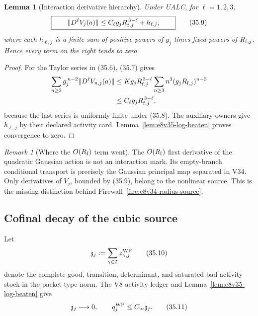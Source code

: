 \documentclass[11pt,oneside]{book}
\newtheorem{lemma}[theorem]{Lemma}
\theoremstyle{definition}
\theoremstyle{remark}
\newtheorem{remark}[theorem]{Remark}
\begin{document}
\begin{lemma}[Interaction derivative hierarchy]
\label{lem:e8v35-derivative-hierarchy}
Under UALC, for \(\ell=1,2,3\),
\[
\boxed{\qquad
 \|D^\ell V_j(a)\|
 \leq
 C_\ell g_jR_{{\rm f},j}^{\,3-\ell}
 +h_{\ell,j},
\qquad}                                                         \tag{35.9}
\]
where each \(h_{\ell,j}\) is a finite sum of positive powers of
\(g_j\) times fixed powers of \(R_{{\rm f},j}\).  Hence every term on
the right tends to zero.
\end{lemma}

\begin{proof}
For the Taylor series in (35.6), (35.7) gives
\[
\begin{split}
 \sum_{n\geq3}g_j^{\,n-2}\|D^\ell V_{n,j}(a)\|
 &\leq
 Kg_jR_{{\rm f},j}^{\,3-\ell}
 \sum_{n\geq3}n^3
 (g_jR_{{\rm f},j})^{n-3}\\
 &\leq C_\ell g_jR_{{\rm f},j}^{\,3-\ell},
\end{split}
\]
because the last series is uniformly finite under (35.8).
The auxiliary owners give \(h_{\ell,j}\) by their declared activity
card.  Lemma~\ref{lem:e8v35-log-beaten} proves convergence to zero.
\end{proof}

\begin{remark}[Where the \(O(R_{\rm f})\) term went]
\label{rem:e8v35-Gaussian-split}
The \(O(R_{\rm f})\) first derivative of the quadratic Gaussian
action is not an interaction mark.  Its empty-branch conditional
transport is precisely the Gaussian principal map separated in
V34.  Only derivatives of \(V_j\), bounded by (35.9), belong to the
nonlinear source.  This is the missing distinction behind
Firewall~\ref{fire:e8v34-radius-source}.
\end{remark}

\subsection{Cofinal decay of the cubic source}

Let
\[
 {\mathfrak z}_j:=
 \sum_{\gamma\in{\cal I}}
 z_{\gamma,j}^{\rm WP}                                           \tag{35.10}
\]
denote the complete good, transition, determinant, and saturated-bad
activity stock in the packet type norm.  The V8 activity ledger and
Lemma~\ref{lem:e8v35-log-beaten} give
\[
             {\mathfrak z}_j\longrightarrow0,\qquad
             q_j^{\rm WP}\leq C_{\rm br}{\mathfrak z}_j.         \tag{35.11}
\]
\end{document}
